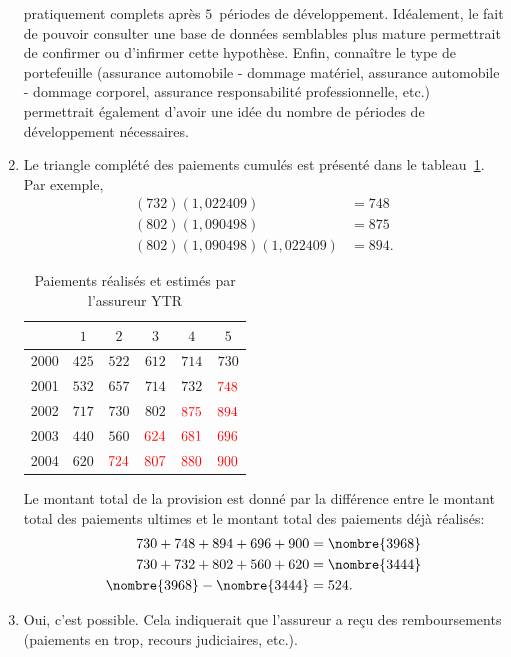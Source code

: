 \begin{exercice}
\begin{sol}
\begin{enumerate}
      pratiquement complets après $5$~périodes de développement.
      Idéalement, le fait de pouvoir consulter une base de données
      semblables plus mature permettrait de confirmer ou d'infirmer
      cette hypothèse. Enfin, connaître le type de portefeuille
      (assurance automobile - dommage matériel, assurance automobile -
      dommage corporel, assurance responsabilité professionnelle,
      etc.) permettrait également d'avoir une idée du nombre de
      périodes de développement nécessaires.
    \item Le triangle complété des paiements cumulés est présenté dans
      le tableau~\ref{tab:tri3}. Par exemple,
      \begin{align*}
        (732)(1,022409) &= 748\\
        (802)(1,090498) &= 875\\
        (802)(1,090498)(1,022409) &= 894.
      \end{align*}
      \begin{table}[!h]
        \centering
        \begin{tabular}{cccccc}
          \toprule
          & $1$ & $2$ & $3$ & $4$ & $5$\\
          \midrule
          2000 & $425$ & $522$ & $612$ & $714$ & $730$\\
          2001 & $532$ & $657$ & $714$ & $732$ & $\textcolor{red}{748}$\\
          2002 & $717$ & $730$ & $802$ & $\textcolor{red}{875}$ & $\textcolor{red}{894}$\\
          2003 & $440$ & $560$ & $\textcolor{red}{624}$ & $\textcolor{red}{681}$ & $\textcolor{red}{696}$\\
          2004 & $620$ & $\textcolor{red}{724}$ & $\textcolor{red}{807}$ & $\textcolor{red}{880}$ & $\textcolor{red}{900}$\\
          \bottomrule
        \end{tabular}
        \caption{Paiements réalisés et estimés par l'assureur YTR}
        \label{tab:tri3}
      \end{table}
      Le montant total de la provision est donné par la différence entre
      le montant total des paiements ultimes et le montant total des
      paiements déjà réalisés:
      \begin{align*}
        730 + 748 + 894 + 696 + 900 &= \nombre{3968}\\
        730 + 732 + 802 + 560 + 620 &= \nombre{3444}\\
        \nombre{3968} - \nombre{3444} &= 524.
      \end{align*}
    \item Oui, c'est possible. Cela indiquerait que l'assureur a reçu
      des remboursements (paiements en trop, recours judiciaires,
      etc.).
    \end{enumerate}
  \end{sol}
\end{exercice}

